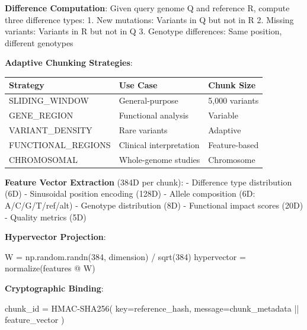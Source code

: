 \documentclass[
  11pt,
]{article}
\newenvironment{Shaded}{}{}
\newcommand{\DecValTok}[1]{\textcolor[rgb]{0.25,0.63,0.44}{#1}}
\newcommand{\NormalTok}[1]{#1}
\newcommand{\OperatorTok}[1]{\textcolor[rgb]{0.40,0.40,0.40}{#1}}
\begin{document}
\textbf{Difference Computation}: Given query genome Q and reference R,
compute three difference types: 1. New mutations: Variants in Q but not
in R 2. Missing variants: Variants in R but not in Q 3. Genotype
differences: Same position, different genotypes

\textbf{Adaptive Chunking Strategies}:

\begin{longtable}[]{@{}lll@{}}
\toprule\noalign{}
Strategy & Use Case & Chunk Size \\
\midrule\noalign{}
\endhead
\bottomrule\noalign{}
\endlastfoot
SLIDING\_WINDOW & General-purpose & 5,000 variants \\
GENE\_REGION & Functional analysis & Variable \\
VARIANT\_DENSITY & Rare variants & Adaptive \\
FUNCTIONAL\_REGIONS & Clinical interpretation & Feature-based \\
CHROMOSOMAL & Whole-genome studies & Chromosome \\
\end{longtable}

\textbf{Feature Vector Extraction} (384D per chunk): - Difference type
distribution (6D) - Sinusoidal position encoding (128D) - Allele
composition (6D: A/C/G/T/ref/alt) - Genotype distribution (8D) -
Functional impact scores (20D) - Quality metrics (5D)

\textbf{Hypervector Projection}:

\begin{Shaded}
\begin{Highlighting}[]
\NormalTok{W }\OperatorTok{=}\NormalTok{ np.random.randn(}\DecValTok{384}\NormalTok{, dimension) }\OperatorTok{/}\NormalTok{ sqrt(}\DecValTok{384}\NormalTok{)}
\NormalTok{hypervector }\OperatorTok{=}\NormalTok{ normalize(features }\OperatorTok{@}\NormalTok{ W)}
\end{Highlighting}
\end{Shaded}

\textbf{Cryptographic Binding}:

\begin{Shaded}
\begin{Highlighting}[]
\NormalTok{chunk\_id }\OperatorTok{=}\NormalTok{ HMAC}\OperatorTok{{-}}\NormalTok{SHA256(}
\NormalTok{    key}\OperatorTok{=}\NormalTok{reference\_hash,}
\NormalTok{    message}\OperatorTok{=}\NormalTok{chunk\_metadata }\OperatorTok{||}\NormalTok{ feature\_vector}
\NormalTok{)}
\end{Highlighting}
\end{Shaded}
\end{document}
